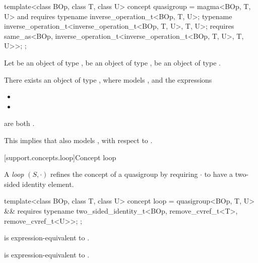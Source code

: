 \begin{itemdecl}
  template<class BOp, class T, class U>
  concept quasigroup = magma<BOp, T, U> and requires {
     typename inverse_operation_t<BOp, T, U>;
     typename inverse_operation_t<inverse_operation_t<BOp, T, U>, T, U>;
     requires same_as<BOp, inverse_operation_t<inverse_operation_t<BOp, T, U>, T, U>>;
  };
\end{itemdecl}
\begin{itemdescr}
   \pnum
   Let  be an object of type ,  be an object of type ,
    be an object of type .

   \pnum
   There exists an object  of type , where  models
   , and the expressions
   \begin{itemize}
      \item {}
      \item {}
   \end{itemize}
   are both .
   \begin{note}
      This implies that  also models , with respect to
      .
   \end{note}
\end{itemdescr}


[support.concepts.loop]{Concept loop}

\pnum
A \textit{loop} $(S, \cdot)$ refines the concept of a quasigroup by requiring $\cdot$ to have a
two-sided identity element.

\begin{itemdecl}
  template<class BOp, class T, class U>
  concept loop = quasigroup<BOp, T, U> && requires {
    typename two_sided_identity_t<BOp, remove_cvref_t<T>, remove_cvref_t<U>>;
  };
\end{itemdecl}
\begin{itemdescr}
   \pnum
    is expression-equivalent to
   .

   \pnum
    is expression-equivalent to
   .
\end{itemdescr}

